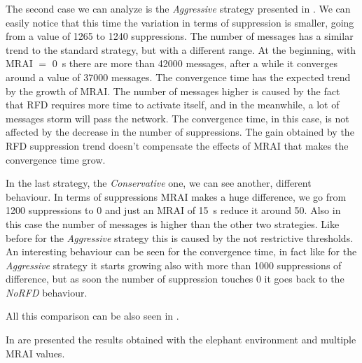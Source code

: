 The second case we can analyze is the \textit{Aggressive} strategy presented
in .
We can easily notice that this time the variation in terms of suppression is smaller,
going from a value of \num{1265} to \num{1240} suppressions.
The number of messages has a similar trend to the standard strategy, but with
a different range.
At the beginning, with \ac{MRAI} $=$ \SI{0}{\second} there are more than \num{42000}
messages, after a while it converges around a value of \num{37000} messages.
The convergence time has the expected trend by the growth of \ac{MRAI}.
The number of messages higher is caused by the fact that \ac{RFD} requires more time
to activate itself, and in the meanwhile, a lot of messages storm will pass the
network.
The convergence time, in this case, is not affected by the decrease in the number
of suppressions.
The gain obtained by the \ac{RFD} suppression trend doesn't compensate the
effects of \ac{MRAI} that makes the convergence time grow.

In the last strategy, the \textit{Conservative} one, we can see another, different
behaviour.
In terms of suppressions \ac{MRAI} makes a huge difference, we go from \num{1200}
suppressions to \num{0} and just an \ac{MRAI} of \SI{15}{\second} reduce it around
\num{50}.
Also in this case the number of messages is higher than the other two strategies.
Like before for the \textit{Aggressive} strategy this is caused by the not
restrictive thresholds.
An interesting behaviour can be seen for the convergence time, in fact like for
the \textit{Aggressive} strategy it starts growing also with more than \num{1000}
suppressions of difference, but as soon the number of suppression touches \num{0}
it goes back to the \textit{NoRFD} behaviour.

All this comparison can be also seen in .

In  are presented the results obtained
with the elephant environment and multiple \ac{MRAI} values.


